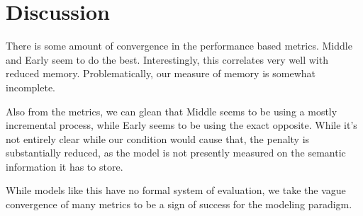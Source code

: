 \section{Discussion}
There is some amount of convergence in the performance based metrics. Middle and Early seem to do the best. Interestingly, this correlates very well with reduced memory. Problematically, our measure of memory is somewhat incomplete. 

Also from the metrics, we can glean that Middle seems to be using a mostly incremental process, while Early seems to be using the exact opposite. While it's not entirely clear while our condition would cause that, the penalty is substantially reduced, as the model is not presently measured on the semantic information it has to store. 

While models like this have no formal system of evaluation, we take the vague convergence of many metrics to be a sign of success for the modeling paradigm.
